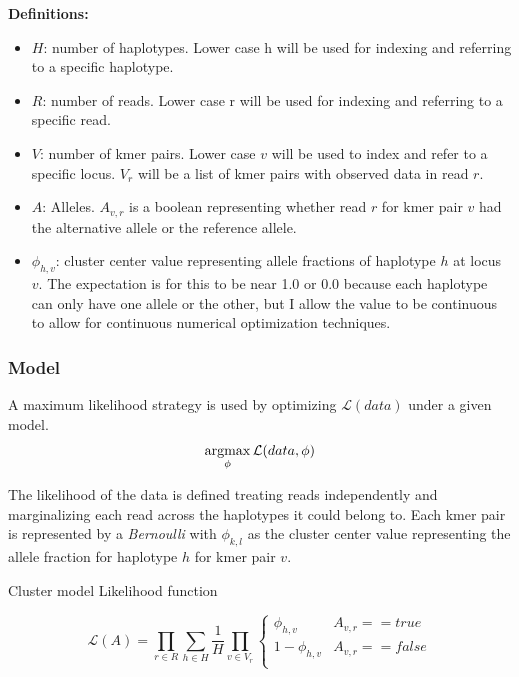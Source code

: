 \textbf{Definitions:}
\begin{itemize}
\item $H$: number of haplotypes. Lower case h will be used for indexing and referring to a specific haplotype.
\item $R$: number of reads. Lower case r will be used for indexing and referring to a specific read. 
\item $V$: number of kmer pairs. Lower case $v$ will be used to index and refer to a specific locus. $V_r$ will be a list of kmer pairs with observed data in read $r$.
\item $A$: Alleles. $A_{v,r}$ is a boolean representing whether read $r$ for kmer pair $v$ had the alternative allele or the reference allele.
\item $\phi_{h,v}$: cluster center value representing allele fractions of haplotype $h$ at locus $v$. The expectation is for this to be near 1.0 or 0.0 because each haplotype can only have one allele or the other, but I allow the value to be continuous to allow for continuous numerical optimization techniques.
\end{itemize}

\noindent
\subsubsection{Model}

A maximum likelihood strategy is used by optimizing $\mathcal{L}(data)$ under a given model. 
\begin{equation}
\operatorname*{argmax}_{\phi} \mathcal{L}(data, \phi)
\end{equation}


The likelihood of the data is defined treating reads independently and marginalizing each read across the haplotypes it could belong to. Each kmer pair is represented by a \textit{Bernoulli} with $\phi_{k,l}$ as the cluster center value representing the allele fraction for haplotype $h$ for kmer pair $v$.

Cluster model Likelihood function

\begin{equation}
\mathcal{L}(A) = \prod_{r \in R} \sum_{h \in H} \frac{1}{H} \prod_{v \in V_r} \begin{cases}       \phi_{h,v} & A_{v,r} == true \\      1 - \phi_{h,v} & A_{v,r} == false \\
\end{cases}
\end{equation}

